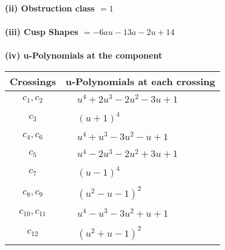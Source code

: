 \documentclass[1p]{elsarticle_modified}
\theoremstyle{definition}
\begin{document}
\flushleft \textbf{(ii) Obstruction class $= 1$}\\~\\
\flushleft \textbf{(iii) Cusp Shapes $= -6 a u-13 a-2 u+14$}\\~\\
\newpage\renewcommand{\arraystretch}{1}
\flushleft \textbf{(iv) u-Polynomials at the component}\newline \\
\begin{tabular}{m{50pt}|m{274pt}}
Crossings & \hspace{64pt}u-Polynomials at each crossing \\
\hline $$\begin{aligned}c_{1},c_{2}\end{aligned}$$&$\begin{aligned}
&u^4+2 u^3-2 u^2-3 u+1
\end{aligned}$\\
\hline $$\begin{aligned}c_{3}\end{aligned}$$&$\begin{aligned}
&(u+1)^4
\end{aligned}$\\
\hline $$\begin{aligned}c_{4},c_{6}\end{aligned}$$&$\begin{aligned}
&u^4+u^3-3 u^2- u+1
\end{aligned}$\\
\hline $$\begin{aligned}c_{5}\end{aligned}$$&$\begin{aligned}
&u^4-2 u^3-2 u^2+3 u+1
\end{aligned}$\\
\hline $$\begin{aligned}c_{7}\end{aligned}$$&$\begin{aligned}
&(u-1)^4
\end{aligned}$\\
\hline $$\begin{aligned}c_{8},c_{9}\end{aligned}$$&$\begin{aligned}
&(u^2- u-1)^2
\end{aligned}$\\
\hline $$\begin{aligned}c_{10},c_{11}\end{aligned}$$&$\begin{aligned}
&u^4- u^3-3 u^2+u+1
\end{aligned}$\\
\hline $$\begin{aligned}c_{12}\end{aligned}$$&$\begin{aligned}
&(u^2+u-1)^2
\end{aligned}$\\
\hline
\end{tabular}\\~\\
\end{document}
